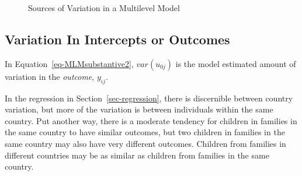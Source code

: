 \documentclass[
  letterpaper,
  DIV=11,
  numbers=noendperiod]{scrreprt}
\begin{document}
\begin{figure}


\caption{\label{fig-variationsources}Sources of Variation in a
Multilevel Model}

\end{figure}%

\subsection{Variation In Intercepts or
Outcomes}\label{variation-in-intercepts-or-outcomes}

In Equation~\ref{eq-MLMsubstantive2}, \(var(u_{0j})\) is the model
estimated amount of variation in the \emph{outcome}, \(y_{ij}\).

In the regression in Section~\ref{sec-regression}, there is discernible
between country variation, but more of the variation is between
individuals within the same country. Put another way, there is a
moderate tendency for children in families in the same country to have
similar outcomes, but two children in families in the same country may
also have very different outcomes. Children from families in different
countries may be as similar as children from families in the same
country.
\end{document}
